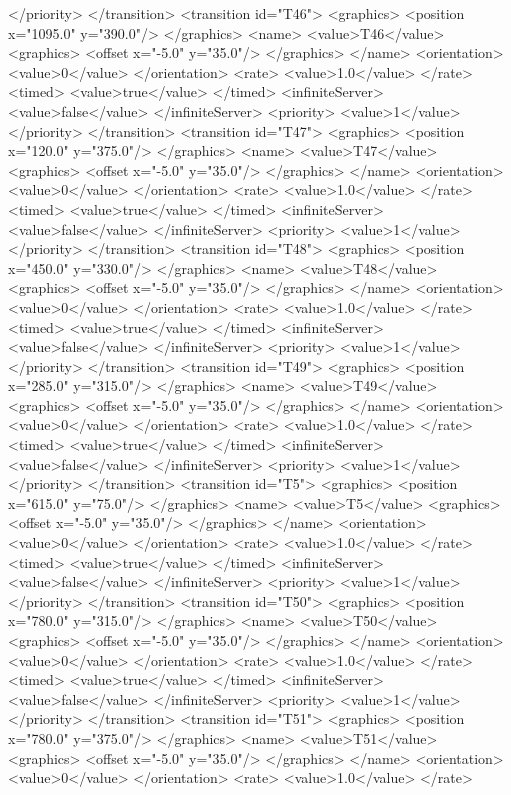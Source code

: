 </priority>
</transition>
<transition id="T46">
<graphics>
<position x="1095.0" y="390.0"/>
</graphics>
<name>
<value>T46</value>
<graphics>
<offset x="-5.0" y="35.0"/>
</graphics>
</name>
<orientation>
<value>0</value>
</orientation>
<rate>
<value>1.0</value>
</rate>
<timed>
<value>true</value>
</timed>
<infiniteServer>
<value>false</value>
</infiniteServer>
<priority>
<value>1</value>
</priority>
</transition>
<transition id="T47">
<graphics>
<position x="120.0" y="375.0"/>
</graphics>
<name>
<value>T47</value>
<graphics>
<offset x="-5.0" y="35.0"/>
</graphics>
</name>
<orientation>
<value>0</value>
</orientation>
<rate>
<value>1.0</value>
</rate>
<timed>
<value>true</value>
</timed>
<infiniteServer>
<value>false</value>
</infiniteServer>
<priority>
<value>1</value>
</priority>
</transition>
<transition id="T48">
<graphics>
<position x="450.0" y="330.0"/>
</graphics>
<name>
<value>T48</value>
<graphics>
<offset x="-5.0" y="35.0"/>
</graphics>
</name>
<orientation>
<value>0</value>
</orientation>
<rate>
<value>1.0</value>
</rate>
<timed>
<value>true</value>
</timed>
<infiniteServer>
<value>false</value>
</infiniteServer>
<priority>
<value>1</value>
</priority>
</transition>
<transition id="T49">
<graphics>
<position x="285.0" y="315.0"/>
</graphics>
<name>
<value>T49</value>
<graphics>
<offset x="-5.0" y="35.0"/>
</graphics>
</name>
<orientation>
<value>0</value>
</orientation>
<rate>
<value>1.0</value>
</rate>
<timed>
<value>true</value>
</timed>
<infiniteServer>
<value>false</value>
</infiniteServer>
<priority>
<value>1</value>
</priority>
</transition>
<transition id="T5">
<graphics>
<position x="615.0" y="75.0"/>
</graphics>
<name>
<value>T5</value>
<graphics>
<offset x="-5.0" y="35.0"/>
</graphics>
</name>
<orientation>
<value>0</value>
</orientation>
<rate>
<value>1.0</value>
</rate>
<timed>
<value>true</value>
</timed>
<infiniteServer>
<value>false</value>
</infiniteServer>
<priority>
<value>1</value>
</priority>
</transition>
<transition id="T50">
<graphics>
<position x="780.0" y="315.0"/>
</graphics>
<name>
<value>T50</value>
<graphics>
<offset x="-5.0" y="35.0"/>
</graphics>
</name>
<orientation>
<value>0</value>
</orientation>
<rate>
<value>1.0</value>
</rate>
<timed>
<value>true</value>
</timed>
<infiniteServer>
<value>false</value>
</infiniteServer>
<priority>
<value>1</value>
</priority>
</transition>
<transition id="T51">
<graphics>
<position x="780.0" y="375.0"/>
</graphics>
<name>
<value>T51</value>
<graphics>
<offset x="-5.0" y="35.0"/>
</graphics>
</name>
<orientation>
<value>0</value>
</orientation>
<rate>
<value>1.0</value>
</rate>

